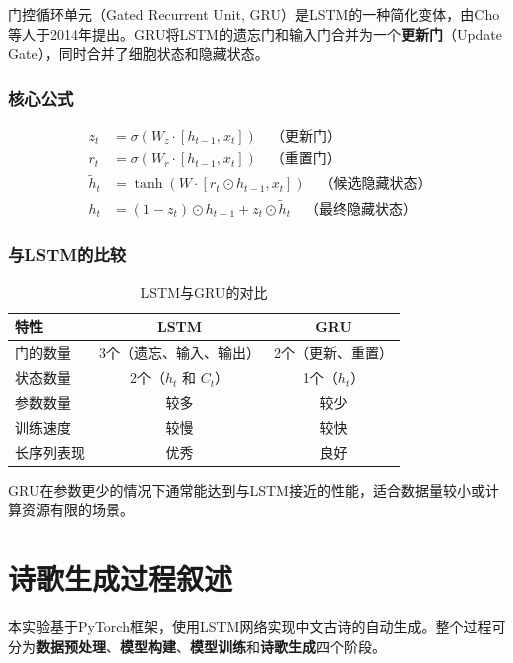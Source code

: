 \documentclass[12pt, a4paper]{ctexart}
\begin{document}
门控循环单元（Gated Recurrent Unit, GRU）是LSTM的一种简化变体，由Cho等人于2014年提出。GRU将LSTM的遗忘门和输入门合并为一个\textbf{更新门}（Update Gate），同时合并了细胞状态和隐藏状态。

\subsubsection{核心公式}

\begin{align}
    z_t &= \sigma(W_z \cdot [h_{t-1}, x_t]) \quad \text{（更新门）} \\
    r_t &= \sigma(W_r \cdot [h_{t-1}, x_t]) \quad \text{（重置门）} \\
    \tilde{h}_t &= \tanh(W \cdot [r_t \odot h_{t-1}, x_t]) \quad \text{（候选隐藏状态）} \\
    h_t &= (1 - z_t) \odot h_{t-1} + z_t \odot \tilde{h}_t \quad \text{（最终隐藏状态）}
\end{align}

\subsubsection{与LSTM的比较}

\begin{table}[H]
\centering
\caption{LSTM与GRU的对比}
\begin{tabular}{lcc}
\toprule
\textbf{特性} & \textbf{LSTM} & \textbf{GRU} \\
\midrule
门的数量 & 3个（遗忘、输入、输出） & 2个（更新、重置） \\
状态数量 & 2个（$h_t$ 和 $C_t$） & 1个（$h_t$） \\
参数数量 & 较多 & 较少 \\
训练速度 & 较慢 & 较快 \\
长序列表现 & 优秀 & 良好 \\
\bottomrule
\end{tabular}
\end{table}

GRU在参数更少的情况下通常能达到与LSTM接近的性能，适合数据量较小或计算资源有限的场景。

\section{诗歌生成过程叙述}

本实验基于PyTorch框架，使用LSTM网络实现中文古诗的自动生成。整个过程可分为\textbf{数据预处理}、\textbf{模型构建}、\textbf{模型训练}和\textbf{诗歌生成}四个阶段。
\end{document}
